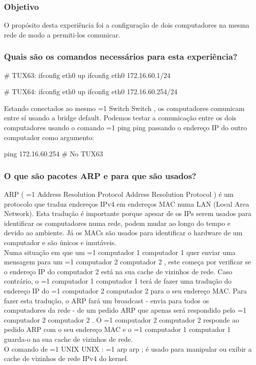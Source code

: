\documentclass[11pt,a4paper]{article}
\newcommand{\hl}[2][1]{%
  \ifnum#1=1\relax
    \textcolor{text-hl1}{#2}%
  \else
    \textcolor{text-hl2}{#2}%
  \fi
}
\begin{document}
\begin{multicols}{2}
\subsubsection{Objetivo}

O propósito desta experiência foi a configuração de dois computadores na mesma rede de modo a permiti-los comunicar.

\subsubsection{Quais são os comandos necessários para esta experiência?}

\begin{bash-darktheme}
    # TUX63:
    ifconfig eth0 up
    ifconfig eth0 172.16.60.1/24

    # TUX64:
    ifconfig eth0 up
    ifconfig eth0 172.16.60.254/24
\end{bash-darktheme}
 
Estando conectados ao mesmo \hl{Switch}, os computadores comunicam entre sí usando a bridge default. Podemos testar a comunicação entre os dois computadores usando o comando \hl{ping} passando o endereço IP do outro computador como argumento: 

\begin{bash-darktheme}
    ping 172.16.60.254 # No TUX63
\end{bash-darktheme}

\subsubsection{O que são pacotes ARP e para que são usados?}

ARP (\hl{Address Resolution Protocol}) é um protocolo que traduz endereços IPv4 em endereços MAC numa LAN (Local Area Network). Esta tradução é importante porque apesar de os IPs serem usados para identificar os computadores numa rede, podem mudar ao longo do tempo e devido ao ambiente. Já os MACs são usados para identificar o hardware de um computador e são únicos e imutáveis. \\
Numa situação em que um \hl[2]{computador 1} quer enviar uma mensagem para um \hl[2]{computador 2}, este começa por verificar se o endereço IP do computador 2 está na sua cache de vizinhos de rede. Caso contrário, o \hl[2]{computador 1} terá de fazer uma tradução do endereço IP do \hl[2]{computador 2} para o seu endereço MAC. Para fazer esta tradução, o ARP fará um broadcast - envia para todos os computadores da rede - de um pedido ARP que apenas será respondido pelo \hl[2]{computador 2}. O \hl[2]{computador 2} responde ao pedido ARP com o seu endereço MAC e o \hl[2]{computador 1} guarda-o na sua cache de vizinhos de rede. \\
O comando de \hl[2]{UNIX}: \hl{arp}; é usado para manipular ou exibir a cache de vizinhos de rede IPv4 do kernel.


\end{multicols}
\end{document}
